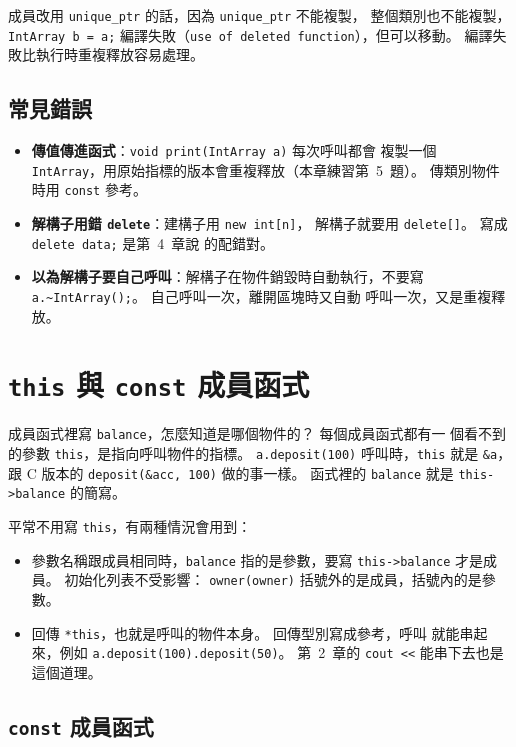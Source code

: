 成員改用 \texttt{unique\_ptr} 的話，因為 \texttt{unique\_ptr} 不能複製，
整個類別也不能複製，\texttt{IntArray b = a;} 編譯失敗（\texttt{use of
deleted function}），但可以移動。 編譯失敗比執行時重複釋放容易處理。

\subsection{常見錯誤}

\begin{itemize}
\item \textbf{傳值傳進函式}：\texttt{void print(IntArray a)} 每次呼叫都會
複製一個 \texttt{IntArray}，用原始指標的版本會重複釋放（本章練習第~5~題）。
傳類別物件時用 \texttt{const} 參考。
\item \textbf{解構子用錯 \texttt{delete}}：建構子用 \texttt{new int[n]}，
解構子就要用 \texttt{delete[]}。 寫成 \texttt{delete data;} 是第~4~章說
的配錯對。
\item \textbf{以為解構子要自己呼叫}：解構子在物件銷毀時自動執行，不要寫
\texttt{a.\textasciitilde IntArray();}。 自己呼叫一次，離開區塊時又自動
呼叫一次，又是重複釋放。
\end{itemize}

\section{\texttt{this} 與 \texttt{const} 成員函式}
\label{sec:this-const}

成員函式裡寫 \texttt{balance}，怎麼知道是哪個物件的？ 每個成員函式都有一
個看不到的參數 \texttt{this}，是指向呼叫物件的指標。 \texttt{a.deposit(100)}
呼叫時，\texttt{this} 就是 \texttt{\&a}，跟 C 版本的
\texttt{deposit(\&acc, 100)} 做的事一樣。 函式裡的 \texttt{balance} 就是
\texttt{this->balance} 的簡寫。

平常不用寫 \texttt{this}，有兩種情況會用到：

\begin{itemize}
\item 參數名稱跟成員相同時，\texttt{balance} 指的是參數，要寫
\texttt{this->balance} 才是成員。 初始化列表不受影響：
\texttt{owner(owner)} 括號外的是成員，括號內的是參數。
\item 回傳 \texttt{*this}，也就是呼叫的物件本身。 回傳型別寫成參考，呼叫
就能串起來，例如 \texttt{a.deposit(100).deposit(50)}。 第~2~章的
\texttt{cout <<} 能串下去也是這個道理。
\end{itemize}

\subsection{\texttt{const} 成員函式}

